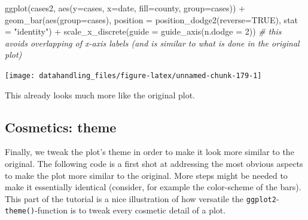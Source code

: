 \documentclass[
  12pt,
]{style/krantz}
\newenvironment{Shaded}{\begin{snugshade}}{\end{snugshade}}
\newcommand{\AttributeTok}[1]{\textcolor[rgb]{0.77,0.63,0.00}{#1}}
\newcommand{\CommentTok}[1]{\textcolor[rgb]{0.56,0.35,0.01}{\textit{#1}}}
\newcommand{\ConstantTok}[1]{\textcolor[rgb]{0.00,0.00,0.00}{#1}}
\newcommand{\DecValTok}[1]{\textcolor[rgb]{0.00,0.00,0.81}{#1}}
\newcommand{\FunctionTok}[1]{\textcolor[rgb]{0.00,0.00,0.00}{#1}}
\newcommand{\NormalTok}[1]{#1}
\newcommand{\SpecialCharTok}[1]{\textcolor[rgb]{0.00,0.00,0.00}{#1}}
\newcommand{\StringTok}[1]{\textcolor[rgb]{0.31,0.60,0.02}{#1}}
\begin{document}
\begin{Shaded}
\begin{Highlighting}[]
\FunctionTok{ggplot}\NormalTok{(cases2, }\FunctionTok{aes}\NormalTok{(}\AttributeTok{y=}\NormalTok{cases, }\AttributeTok{x=}\NormalTok{date, }\AttributeTok{fill=}\NormalTok{county, }\AttributeTok{group=}\NormalTok{cases)) }\SpecialCharTok{+}
  \FunctionTok{geom\_bar}\NormalTok{(}\FunctionTok{aes}\NormalTok{(}\AttributeTok{group=}\NormalTok{cases), }\AttributeTok{position =} \FunctionTok{position\_dodge2}\NormalTok{(}\AttributeTok{reverse=}\ConstantTok{TRUE}\NormalTok{), }\AttributeTok{stat =} \StringTok{"identity"}\NormalTok{) }\SpecialCharTok{+}
    \FunctionTok{scale\_x\_discrete}\NormalTok{(}\AttributeTok{guide =} \FunctionTok{guide\_axis}\NormalTok{(}\AttributeTok{n.dodge =} \DecValTok{2}\NormalTok{))  }\CommentTok{\# this avoids overlapping of x{-}axis labels (and is similar to what is done in the original plot)}
\end{Highlighting}
\end{Shaded}

\texttt{[image: datahandling\_files/figure-latex/unnamed-chunk-179-1]}

This already looks much more like the original plot.

\hypertarget{cosmetics-theme}{%
\subsection{Cosmetics: theme}\label{cosmetics-theme}}

Finally, we tweak the plot's theme in order to make it look more similar to the original. The following code is a first shot at addressing the most obvious aspects to make the plot more similar to the original. More steps might be needed to make it essentially identical (consider, for example the color-scheme of the bars). This part of the tutorial is a nice illustration of how versatile the \texttt{ggplot2}-\texttt{theme()}-function is to tweak every cosmetic detail of a plot.
\end{document}
